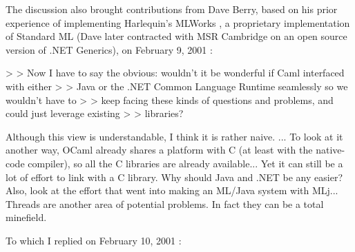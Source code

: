 \documentclass[acmsmall,screen]{acmart}
\begin{document}
The discussion also brought contributions from Dave Berry, based on his prior experience of implementing
Harlequin’s MLWorks \citep{RefHarlequin}, a proprietary
implementation of Standard ML (Dave later contracted with MSR Cambridge on an open source version of .NET Generics), on February
9, 2001 \citep{RefCamlArchive3}:
\begin{verbquote}
> > Now I have to say the obvious: wouldn't it be wonderful if Caml interfaced with either 
> > Java or the .NET Common Language Runtime seamlessly so we wouldn't have to 
> > keep facing these kinds of questions and problems, and could just leverage existing 
> > libraries?   

Although this view is understandable, I think it is rather naive. ... To look at it another way, OCaml already shares a platform with C (at least with the native-code compiler), so all the C libraries are already available... Yet it can still be a lot of effort to link with a C library.  Why should Java and .NET be any easier?  Also, look at the effort that went into making an ML/Java system with MLj... Threads are another area of potential problems.  In fact they can be a total minefield.
\end{verbquote}
To which I replied on February 10, 2001 \citep{RefCamlArchive4}:
\end{document}
